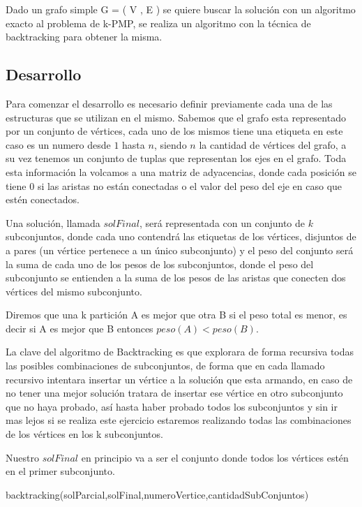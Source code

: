 Dado un grafo simple G = ( V , E ) se quiere buscar la solución con un algoritmo exacto al problema de k-PMP, se realiza un algoritmo con la técnica de backtracking para obtener la misma.

\subsection{Desarrollo}

Para comenzar el desarrollo es necesario definir previamente cada una de las estructuras que se utilizan en el mismo. Sabemos que el grafo esta representado por un conjunto de vértices, cada uno de los mismos tiene una etiqueta en este caso es un numero desde $1$ hasta $n$, siendo $n$ la cantidad de vértices del grafo, a su vez tenemos un conjunto de tuplas que representan los ejes en el grafo. Toda esta información la volcamos a una matriz de adyacencias, donde cada posición se tiene 0 si las aristas no están conectadas o el valor del peso del eje en caso que estén conectados.

Una solución, llamada $solFinal$, será representada con un conjunto de $k$ subconjuntos, donde cada uno contendrá las etiquetas de los vértices, disjuntos de a pares (un vértice pertenece a un único subconjunto) y el peso del conjunto será la suma de cada uno de los pesos de los subconjuntos, donde el peso del subconjunto se entienden a la suma de los pesos de las aristas que conecten dos vértices del mismo subconjunto.

Diremos que una k partición A es mejor que otra B si el peso total es menor, es decir si A es mejor que B entonces $peso(A) < peso(B)$. 

La clave del algoritmo de Backtracking es que explorara de forma recursiva todas las posibles combinaciones de subconjuntos, de forma que en cada llamado recursivo intentara insertar un vértice a la solución que esta armando, en caso de no tener una mejor solución tratara de insertar ese vértice en otro subconjunto que no haya probado, así hasta haber probado todos los subconjuntos y sin ir mas lejos si se realiza este ejercicio estaremos realizando todas las combinaciones de los vértices en los k subconjuntos.	

Nuestro $solFinal$ en principio va a ser el conjunto donde todos los vértices estén en el primer subconjunto.


\begin{algorithm}
  \begin{algorithmic}[1]\parskip=1mm
 \caption{ backtracking(solParcial,solFinal,numeroVertice,cantidadSubConjuntos)}
  \end{algorithmic}
  \end{algorithm}

